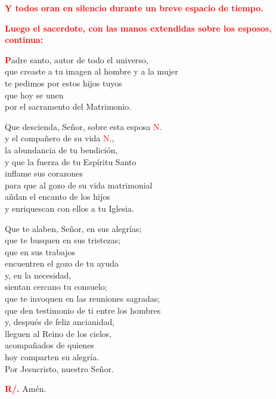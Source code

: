 \documentclass[12pt, letterpaper, spanish]{report}
\begin{document}
\large{\bfseries \textcolor{red}{Y todos oran en silencio durante un breve espacio de tiempo.}}\newline

\large{\bfseries \textcolor{red}{Luego el sacerdote, con las manos extendidas sobre los esposos, continua:}}\newline

\Large \lettrine{\bfseries \textcolor{red}{P}}{}adre santo, autor de todo el universo,\\
que creaste a tu imagen al hombre y a la mujer\\
te pedimos por estos hijos tuyos\\
que hoy se unen\\
por el sacramento del Matrimonio.\newline

Que descienda, Se\~nor, sobre esta esposa \textcolor{red}{N.}\\
y el compa\~nero de su vida \textcolor{red}{N.},\\
la abundancia de tu bendici\'on,\\
y que la fuerza de tu Esp\'iritu Santo\\
inflame sus corazones\\
para que al gozo de su vida matrimonial\\
a\~ndan el encanto de los hijos\\
y enriquescan con ellos a tu Iglesia.\newline

Que te alaben, Se\~nor, en sus alegr\'ias;\\
que te busquen en sus tristezas;\\
que en sus trabajos\\
encuentren el gozo de tu ayuda\\
y, en la necesidad,\\
sientan cercano tu consuelo;\\
que te invoquen en las reuniones sagradas;\\
que den testimonio de ti entre los hombres\\
y, despu\'es de feliz ancianidad,\\
lleguen al Reino de los cielos,\\
acompa\~nados de quienes\\
hoy comparten su alegr\'ia.\\
Por Jesucristo, nuestro Se\~nor.\newline

\Large \hspace{-0.9cm} {\bfseries \textcolor{red}{R/.}} \hspace{0.5cm} Am\'en.\newline
\end{document}
